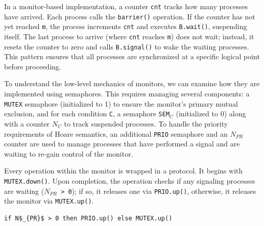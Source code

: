 In a monitor-based implementation, a counter \texttt{cnt} tracks how many processes have arrived. Each process calls the \texttt{barrier()} operation. If the counter has not yet reached \texttt{m}, the process increments \texttt{cnt} and executes \texttt{B.wait()}, suspending itself. The last process to arrive (where \texttt{cnt} reaches \texttt{m}) does not wait; instead, it resets the counter to zero and calls \texttt{B.signal()} to wake the waiting processes. This pattern ensures that all processes are synchronized at a specific logical point before proceeding.

To understand the low-level mechanics of monitors, we can examine how they are implemented using semaphores. This requires managing several components: a \texttt{MUTEX} semaphore (initialized to 1) to ensure the monitor's primary mutual exclusion, and for each condition \texttt{C}, a semaphore \texttt{SEM}$_C$ (initialized to 0) along with a counter \texttt{$N_C$} to track suspended processes. To handle the priority requirements of Hoare semantics, an additional \texttt{PRIO} semaphore and an \texttt{$N_{PR}$} counter are used to manage processes that have performed a signal and are waiting to re-gain control of the monitor.

Every operation within the monitor is wrapped in a protocol. It begins with \texttt{MUTEX.down()}. Upon completion, the operation checks if any signaling processes are waiting (\texttt{$N_{PR}$ > 0}); if so, it releases one via \texttt{PRIO.up()}, otherwise, it releases the monitor via \texttt{MUTEX.up()}. 

\begin{minipage}{\textwidth}
\begin{lstlisting}[mathescape]
if N$_{PR}$ > 0 then PRIO.up() else MUTEX.up()
\end{lstlisting}
\end{minipage}\\

